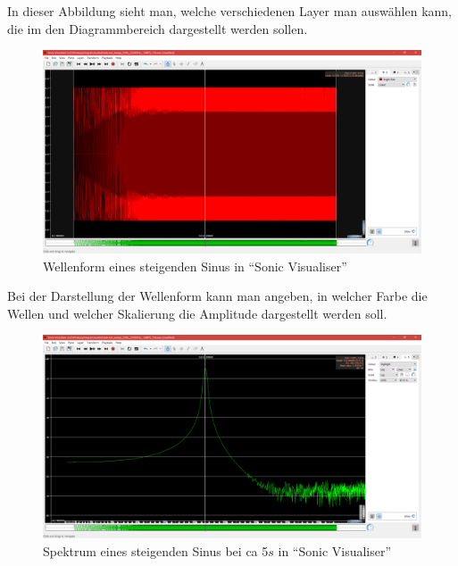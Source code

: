 \documentclass[a4paper]{article}
\begin{document}
\noindent
In dieser Abbildung sieht man, welche verschiedenen Layer man auswählen kann, die im den Diagrammbereich dargestellt werden sollen.
\begin{figure}[H]
    \centering
    \begin{minipage}{1.0\textwidth}
        \centering
        \includegraphics[width=1.0\textwidth]{Sonic_Sine_Sweep_Wave.png}
        \caption{Wellenform eines steigenden Sinus in "`Sonic Visualiser"'}
    \end{minipage}
\end{figure}
\noindent
Bei der Darstellung der Wellenform kann man angeben, in welcher Farbe die Wellen und welcher Skalierung die Amplitude dargestellt werden soll.
\vspace{2em}
\begin{figure}[H]
    \centering
    \begin{minipage}{1.0\textwidth}
        \centering
        \includegraphics[width=1.0\textwidth]{Sonic_Sine_Sweep_Spectrum_on_5s.png}
        \caption{Spektrum eines steigenden Sinus bei ca 5$s$ in "`Sonic Visualiser"'}
    \end{minipage}
\end{figure}
\end{document}
